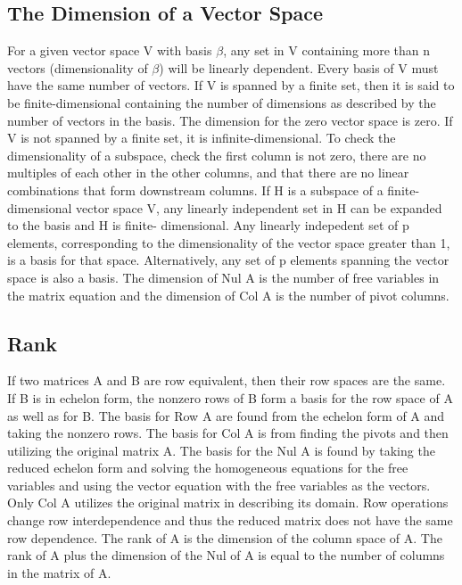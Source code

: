 \documentclass[12pt]{article}
\begin{document}
\subsection{The Dimension of a Vector Space}
For a given vector space V with basis $\beta$, any set in V containing more than n vectors (dimensionality of $\beta$) will be linearly 
dependent. Every basis of V must have the same number of vectors. If V is spanned by a finite set, then it is said to be finite-dimensional 
containing the number of dimensions as described by the number of vectors in the basis. The dimension for the zero vector space is zero. 
If V is not spanned by a finite set, it is infinite-dimensional. To check the dimensionality of a subspace, check the first column is not 
zero, there are no multiples of each other in the other columns, and that there are no linear combinations that form downstream columns. 
\newline
\newline
If H is a subspace of a finite-dimensional vector space V, any linearly independent set in H can be expanded to the basis and H is finite-
dimensional. Any linearly indepedent set of p elements, corresponding to the dimensionality of the vector space greater than 1, is a basis 
for that space. Alternatively, any set of p elements spanning the vector space is also a basis. The dimension of Nul A is the number of free 
variables in the matrix equation and the dimension of Col A is the number of pivot columns. 
\subsection{Rank}
If two matrices A and B are row equivalent, then their row spaces are the same. If B is in echelon form, the nonzero rows of B form a basis
 for the row space of A as well as for B. The basis for Row A are found from the echelon form of A and taking the nonzero rows. The basis 
for Col A is from finding the pivots and then utilizing the original matrix A. The basis for the Nul A is found by taking the reduced 
echelon form and solving the homogeneous equations for the free variables and using the vector equation with the free variables as the 
vectors. Only Col A utilizes the original matrix in describing its domain. Row operations change row interdependence and thus the reduced
 matrix does not have the same row dependence. 
 \newline
 \newline
 The rank of A is the dimension of the column space of A. The rank of A plus the dimension of the Nul of A is equal to the number of columns 
 in the matrix of A. 
\end{document}

